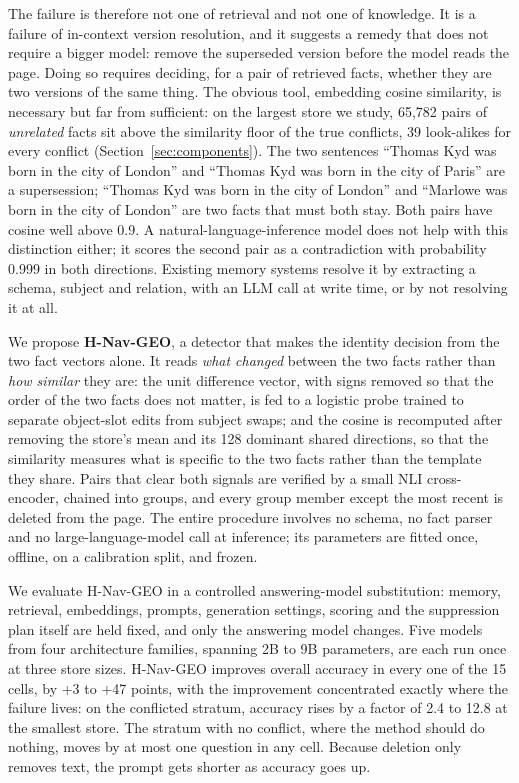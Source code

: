 \documentclass[journal=jcisd8,manuscript=article]{achemso}
\begin{document}
The failure is therefore not one of retrieval and not one of knowledge. It is a failure of in-context version resolution, and it suggests a remedy that does not require a bigger model: remove the superseded version before the model reads the page. Doing so requires deciding, for a pair of retrieved facts, whether they are two versions of the same thing. The obvious tool, embedding cosine similarity, is necessary but far from sufficient: on the largest store we study, 65,782 pairs of \emph{unrelated} facts sit above the similarity floor of the true conflicts, 39 look-alikes for every conflict (Section~\ref{sec:components}). The two sentences ``Thomas Kyd was born in the city of London'' and ``Thomas Kyd was born in the city of Paris'' are a supersession; ``Thomas Kyd was born in the city of London'' and ``Marlowe was born in the city of London'' are two facts that must both stay. Both pairs have cosine well above 0.9. A natural-language-inference model does not help with this distinction either; it scores the second pair as a contradiction with probability 0.999 in both directions. Existing memory systems resolve it by extracting a schema, subject and relation, with an LLM call at write time, or by not resolving it at all.

We propose \textbf{H-Nav-GEO}, a detector that makes the identity decision from the two fact vectors alone. It reads \emph{what changed} between the two facts rather than \emph{how similar} they are: the unit difference vector, with signs removed so that the order of the two facts does not matter, is fed to a logistic probe trained to separate object-slot edits from subject swaps; and the cosine is recomputed after removing the store's mean and its 128 dominant shared directions, so that the similarity measures what is specific to the two facts rather than the template they share. Pairs that clear both signals are verified by a small NLI cross-encoder, chained into groups, and every group member except the most recent is deleted from the page. The entire procedure involves no schema, no fact parser and no large-language-model call at inference; its parameters are fitted once, offline, on a calibration split, and frozen.

We evaluate H-Nav-GEO in a controlled answering-model substitution: memory, retrieval, embeddings, prompts, generation settings, scoring and the suppression plan itself are held fixed, and only the answering model changes. Five models from four architecture families, spanning 2B to 9B parameters, are each run once at three store sizes. H-Nav-GEO improves overall accuracy in every one of the 15 cells, by +3 to +47 points, with the improvement concentrated exactly where the failure lives: on the conflicted stratum, accuracy rises by a factor of 2.4 to 12.8 at the smallest store. The stratum with no conflict, where the method should do nothing, moves by at most one question in any cell. Because deletion only removes text, the prompt gets shorter as accuracy goes up.
\end{document}
